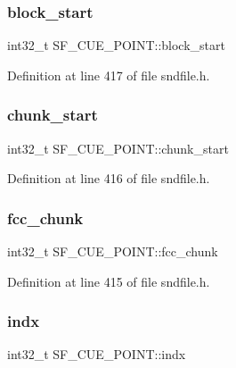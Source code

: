 \subsubsection{\texorpdfstring{block\_start}{block\_start}}
{\footnotesize\ttfamily int32\+\_\+t S\+F\+\_\+\+C\+U\+E\+\_\+\+P\+O\+I\+N\+T\+::block\+\_\+start}



Definition at line 417 of file sndfile.\+h.

\mbox{\label{struct_s_f___c_u_e___p_o_i_n_t_a9a582a14e020cf57dd9d3386c6a9ed27}} 
\subsubsection{\texorpdfstring{chunk\_start}{chunk\_start}}
{\footnotesize\ttfamily int32\+\_\+t S\+F\+\_\+\+C\+U\+E\+\_\+\+P\+O\+I\+N\+T\+::chunk\+\_\+start}



Definition at line 416 of file sndfile.\+h.

\mbox{\label{struct_s_f___c_u_e___p_o_i_n_t_acc68b25045d7f945837d98cdfe9a4855}} 
\subsubsection{\texorpdfstring{fcc\_chunk}{fcc\_chunk}}
{\footnotesize\ttfamily int32\+\_\+t S\+F\+\_\+\+C\+U\+E\+\_\+\+P\+O\+I\+N\+T\+::fcc\+\_\+chunk}



Definition at line 415 of file sndfile.\+h.

\mbox{\label{struct_s_f___c_u_e___p_o_i_n_t_a346aebc992e886ce24654d2190842d05}} 
\subsubsection{\texorpdfstring{indx}{indx}}
{\footnotesize\ttfamily int32\+\_\+t S\+F\+\_\+\+C\+U\+E\+\_\+\+P\+O\+I\+N\+T\+::indx}



